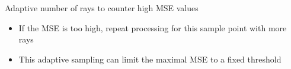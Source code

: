 \begin{frame}[t]{Adaptive number of rays to counter high MSE values}
      \begin{itemize}
        \item If the MSE is too high, repeat processing for this sample point with more rays
        \item This adaptive sampling can limit the maximal MSE to a fixed threshold
      \end{itemize}
\end{frame}
